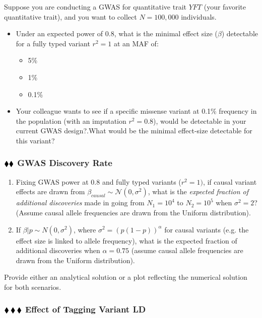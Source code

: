\documentclass{pset}
\begin{document}
Suppose you are conducting a GWAS for quantitative trait $YFT$ (your favorite quantitative trait), and you want to collect $N=100,000$ individuals. 

\begin{itemize}
	\item Under an expected power of 0.8, what is the minimal effect size ($\beta$) detectable for a fully typed variant $r^2 = 1$ at an MAF of: 
	\begin{itemize}
		\item 5\% 
		\item 1\%
		\item 0.1\%
	\end{itemize}
	\item Your colleague wants to see if a specific missense variant at 0.1\% frequency in the population (with an imputation $r^2 = 0.8$), would be detectable in your current GWAS design?.What would be the minimal effect-size detectable for this variant?  
\end{itemize}

\subsubsection*{$\mathbin{\blacklozenge}\mathbin{\blacklozenge}$ GWAS Discovery Rate} 

\begin{enumerate}
\item Fixing GWAS power at $0.8$ and fully typed variants ($r^2 = 1)$, if causal variant effects are drawn from $\beta_{causal} \sim \mathcal{N}(0,\sigma^2)$, what is the \textit{expected fraction of additional discoveries} made in going from $N_1 = 10^4$ to $N_2 = 10^5$ when $\sigma^2 = 2$? (Assume causal allele frequencies are drawn from the Uniform distribution). 
	
\item If $\beta | p \sim N(0, \sigma^2)$, where $\sigma^2 = \left(p(1-p)\right)^{\alpha}$ for causal variants (e.g. the effect size is linked to allele frequency), what is the expected fraction of additional discoveries when $\alpha = 0.75$ (assume causal allele frequencies are drawn from the Uniform distribution).
\end{enumerate}

Provide either an analytical solution or a plot reflecting the numerical solution for both scenarios. 

\subsubsection*{$\mathbin{\blacklozenge}\mathbin{\blacklozenge}\mathbin{\blacklozenge}$  Effect of Tagging Variant LD}
\end{document}
